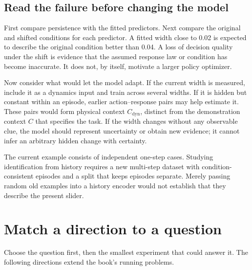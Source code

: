 \subsection{Read the failure before changing the model}
First compare persistence with the fitted predictors. Next compare the original and shifted conditions for each predictor. A fitted width close to 0.02 is expected to describe the original condition better than 0.04. A loss of decision quality under the shift is evidence that the assumed response law or condition has become inaccurate. It does not, by itself, motivate a larger policy optimizer.

Now consider what would let the model adapt. If the current width is measured, include it as a dynamics input and train across several widths. If it is hidden but constant within an episode, earlier action--response pairs may help estimate it. These pairs would form physical context $C_{\mathrm{dyn}}$, distinct from the demonstration context $C$ that specifies the task. If the width changes without any observable clue, the model should represent uncertainty or obtain new evidence; it cannot infer an arbitrary hidden change with certainty.

The current example consists of independent one-step cases. Studying identification from history requires a new multi-step dataset with condition-consistent episodes and a split that keeps episodes separate. Merely passing random old examples into a history encoder would not establish that they describe the present slider.

\section{Match a direction to a question}
Choose the question first, then the smallest experiment that could answer it. The following directions extend the book's running problems.

